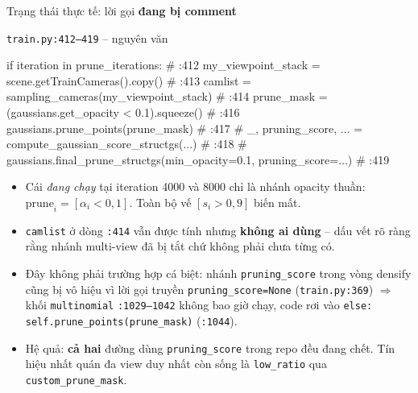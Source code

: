\begin{frame}[fragile]{Trạng thái thực tế: lời gọi \textbf{đang bị comment}}
\scriptsize
\begin{block}{\texttt{train.py:412--419} -- nguyên văn}
\begin{semiverbatim}
if iteration in prune_iterations:                                          # :412
    my_viewpoint_stack = scene.getTrainCameras().copy()                    # :413
    camlist = sampling_cameras(my_viewpoint_stack)                         # :414
    prune_mask = (gaussians.get_opacity < 0.1).squeeze()                   # :416
    gaussians.prune_points(prune_mask)                                     # :417
    # _, pruning_score, ... = compute_gaussian_score_structgs(...)         # :418
    # gaussians.final_prune_structgs(min_opacity=0.1, pruning_score=...)   # :419
\end{semiverbatim}
\end{block}
\footnotesize
\begin{itemize}\scriptsize
    \item Cái \emph{đang chạy} tại iteration 4000 và 8000 chỉ là nhánh opacity thuần: $\text{prune}_i=[\alpha_i<0{,}1]$. Toàn bộ vế $[s_i>0{,}9]$ biến mất.
    \item \texttt{camlist} ở dòng \texttt{:414} vẫn được tính nhưng \textbf{không ai dùng} -- dấu vết rõ ràng rằng nhánh multi-view đã bị tắt chứ không phải chưa từng có.
    \item Đây không phải trường hợp cá biệt: nhánh \texttt{pruning\_score} trong vòng densify cũng bị vô hiệu vì lời gọi truyền \texttt{pruning\_score=None} (\texttt{train.py:369}) $\Rightarrow$ khối \texttt{multinomial} \texttt{:1029--1042} không bao giờ chạy, code rơi vào \texttt{else: self.prune\_points(prune\_mask)} (\texttt{:1044}).
    \item Hệ quả: \textbf{cả hai} đường dùng \texttt{pruning\_score} trong repo đều đang chết. Tín hiệu nhất quán đa view duy nhất còn sống là \texttt{low\_ratio} qua \texttt{custom\_prune\_mask}.
\end{itemize}
\end{frame}

